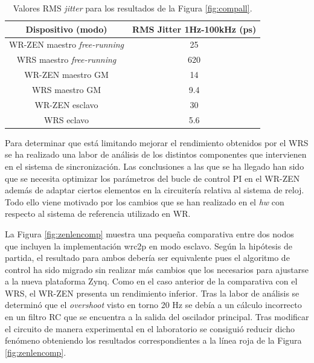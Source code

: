 \begin{table}
	\renewcommand{\arraystretch}{1.3}
	\caption{Valores RMS \textit{jitter} para los resultados de la Figura 
	\ref{fig:compall}.}
	\label{tab:compall}
	\centering
	\begin{tabular}{|c||c|}
		\hline
		Dispositivo (modo) & RMS Jitter 1Hz-100kHz (ps) \\
		\hline
		WR-ZEN maestro \textit{free-running} & 25 \\
		\hline
		WRS maestro \textit{free-running} & 620 \\
		\hline
		WR-ZEN maestro GM & 14 \\
		\hline
		WRS maestro GM & 9.4 \\
		\hline
		WR-ZEN esclavo & 30 \\
		\hline
		WRS eclavo & 5.6 \\
		\hline
	\end{tabular}
\end{table}

Para determinar que está limitando mejorar el rendimiento obtenidos por el WRS 
se ha realizado una labor de análisis de los distintos componentes que 
intervienen en el sistema de sincronización. Las conclusiones a las que se ha 
llegado han sido que se necesita optimizar los parámetros del bucle de control 
PI en el WR-ZEN además de adaptar ciertos elementos en la circuitería relativa 
al sistema de reloj. Todo ello viene motivado por los cambios que se han 
realizado en el \textit{hw} con respecto al sistema de referencia utilizado en 
WR.

La Figura \ref{fig:zenlencomp} muestra una pequeña comparativa entre dos nodos 
que incluyen la implementación \gls{wrc2p} en modo esclavo. Según la hipótesis 
de partida, el resultado para ambos debería ser equivalente pues el algoritmo 
de control ha sido migrado sin realizar más cambios que los necesarios para 
ajustarse a la nueva plataforma Zynq. Como en el caso anterior de la 
comparativa con el WRS, el WR-ZEN presenta un rendimiento inferior. Tras la 
labor de análisis se determinó que el \textit{overshoot} visto en torno 20 Hz 
se debía a un cálculo incorrecto en un filtro RC que se encuentra a la salida 
del oscilador principal. Tras modificar el circuito de manera experimental en 
el laboratorio se consiguió reducir dicho fenómeno obteniendo los resultados 
correspondientes a la línea roja de la Figura \ref{fig:zenlencomp}.


